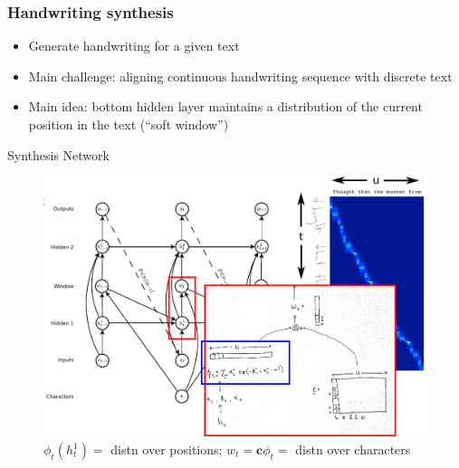 \documentclass[10pt,xcolor=dvipsnames]{beamer}
\begin{document}
\begin{frame}
  \frametitle{Handwriting synthesis}
  \begin{itemize}
  \item Generate handwriting for a given text
  \item Main challenge: aligning continuous handwriting sequence with discrete text
  \item Main idea: bottom hidden layer maintains a distribution of the current position
    in the text (``soft window'')
  \end{itemize}
\end{frame}

\begin{frame}{Synthesis Network}
  \begin{figure}
    \centering
  \includegraphics[width=.9\linewidth]{fig/synthesis_network3.png}
    \caption{$\phi_t(h_t^1) = $ distn over positions; $w_t = \mathbf{c}
      \phi_t =$ distn over characters}
    \label{fig:synthesis-network}
  \end{figure}
\end{frame}
\end{document}
